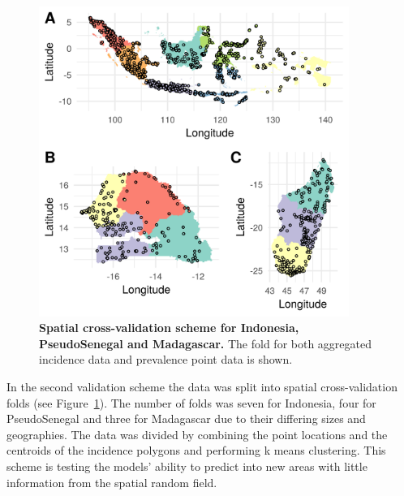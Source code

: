 \documentclass[10pt,letterpaper]{article}
\begin{document}
\begin{figure}[!h]
\centering

\includegraphics[width = 0.9\textwidth]{figures/spatial_crossvalidation_full.png} %

\caption{{\bf Spatial cross-validation scheme for Indonesia, PseudoSenegal and Madagascar.} The fold for both aggregated incidence data and prevalence point data is shown.}
\label{fig:cv_spatial}
\end{figure}



In the second validation scheme the data was split into spatial cross-validation folds (see Figure~\ref{fig:cv_spatial}).
The number of folds was seven for Indonesia, four for PseudoSenegal and three for Madagascar due to their differing sizes and geographies.
The data was divided by combining the point locations and the centroids of the incidence polygons and performing k means clustering.
This scheme is testing the models' ability to predict into new areas with little information from the spatial random field.
\end{document}
